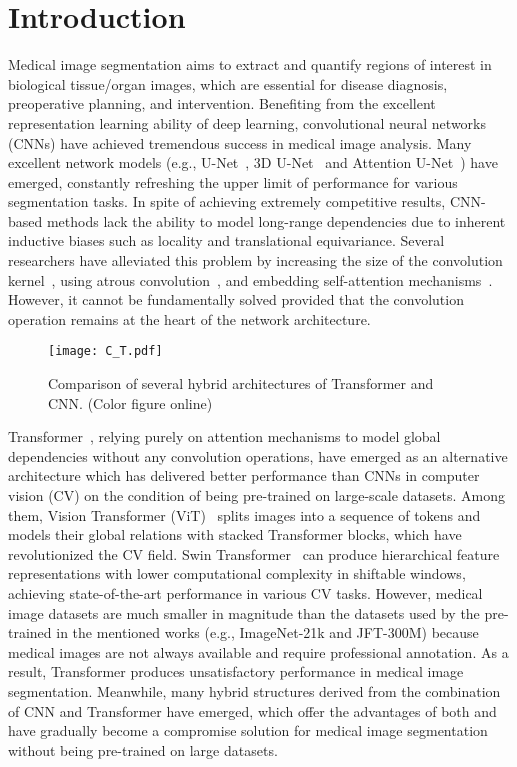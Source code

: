 \documentclass[runningheads]{llncs}
\begin{document}
\section{Introduction}




Medical image segmentation aims to extract and quantify regions of interest in biological tissue/organ images, which are essential for disease diagnosis, preoperative planning, and intervention. Benefiting from the excellent representation learning ability of deep learning, convolutional neural networks (CNNs) have achieved tremendous success in medical image analysis. Many excellent network models (e.g., U-Net~\cite{unet}, 3D U-Net~\cite{3dunet} and Attention U-Net~\cite{ATT-UNet}) have emerged, constantly refreshing the upper limit of performance for various segmentation tasks. In spite of achieving extremely competitive results, CNN-based methods lack the ability to model long-range dependencies due to inherent inductive biases such as locality and translational equivariance. Several researchers have alleviated this problem by increasing the size of the convolution kernel~\cite{largekernel}, using atrous convolution~\cite{dilated}, and embedding self-attention mechanisms~\cite{non-local}. However, it cannot be fundamentally solved provided that the convolution operation remains at the heart of the network architecture.




\begin{figure}[tbp]
\centering
 \texttt{[image: C\_T.pdf]}
\caption{Comparison of several hybrid architectures of Transformer and CNN. 
(Color figure online)} \label{fig1}
\end{figure}

Transformer~\cite{transformer}, relying purely on attention mechanisms to model global dependencies without any convolution operations, have emerged as an alternative architecture which has delivered better performance than CNNs in computer vision (CV) on the condition of being pre-trained on large-scale datasets. Among them, Vision Transformer (ViT)~\cite{ViT} splits images into a sequence of tokens and models their global relations with stacked Transformer blocks, which have revolutionized the CV field. Swin Transformer~\cite{Swin} can produce hierarchical feature representations with lower computational complexity in shiftable windows, achieving state-of-the-art performance in various CV tasks. However, medical image datasets are much smaller in magnitude than the datasets used by the pre-trained in the mentioned works (e.g., ImageNet-21k and JFT-300M) because medical images are not always available and require professional annotation. As a result, Transformer produces unsatisfactory performance in medical image segmentation. Meanwhile, many hybrid structures derived from the combination of CNN and Transformer have emerged, which offer the advantages of both and have gradually become a compromise solution for medical image segmentation without being pre-trained on large datasets.
\end{document}
